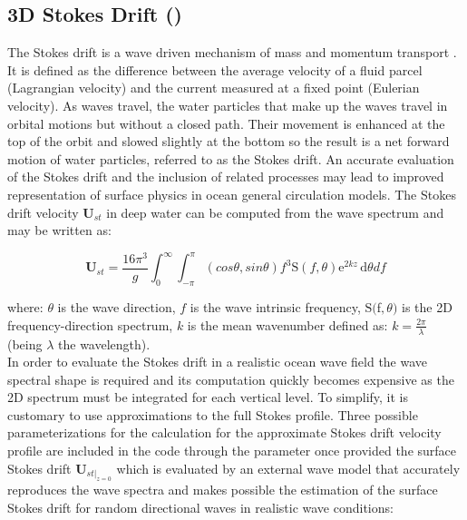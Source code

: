 \documentclass[../tex_main/NEMO_manual]{subfiles}
\begin{document}
\subsection{3D Stokes Drift (\protect{})}
\label{subsec:SBC_wave_sdw}

The Stokes drift is a wave driven mechanism of mass and momentum transport \citep{Stokes_1847}. 
It is defined as the difference between the average velocity of a fluid parcel (Lagrangian velocity) 
and the current measured at a fixed point (Eulerian velocity). 
As waves travel, the water particles that make up the waves travel in orbital motions but 
without a closed path. Their movement is enhanced at the top of the orbit and slowed slightly 
at the bottom so the result is a net forward motion of water particles, referred to as the Stokes drift. 
An accurate evaluation of the Stokes drift and the inclusion of related processes may lead to improved 
representation of surface physics in ocean general circulation models.
The Stokes drift velocity $\mathbf{U}_{st}$ in deep water can be computed from the wave spectrum and may be written as: 

\begin{equation} \label{eq:sbc_wave_sdw}
\mathbf{U}_{st} = \frac{16{\pi^3}} {g} 
                \int_0^\infty \int_{-\pi}^{\pi} (cos{\theta},sin{\theta}) {f^3}
                \mathrm{S}(f,\theta) \mathrm{e}^{2kz}\,\mathrm{d}\theta {d}f
\end{equation}

where: ${\theta}$ is the wave direction, $f$ is the wave intrinsic frequency, 
$\mathrm{S}($f$,\theta)$ is the 2D frequency-direction spectrum, 
$k$ is the mean wavenumber defined as: 
$k=\frac{2\pi}{\lambda}$ (being $\lambda$ the wavelength). \\

In order to evaluate the Stokes drift in a realistic ocean wave field the wave spectral shape is required 
and its computation quickly becomes expensive as the 2D spectrum must be integrated for each vertical level. 
To simplify, it is customary to use approximations to the full Stokes profile.
Three possible parameterizations for the calculation for the approximate Stokes drift velocity profile 
are included in the code through the  parameter once provided the surface Stokes drift 
$\mathbf{U}_{st |_{z=0}}$ which is evaluated by an external wave model that accurately reproduces the wave spectra 
and makes possible the estimation of the surface Stokes drift for random directional waves in 
realistic wave conditions:
\end{document}
